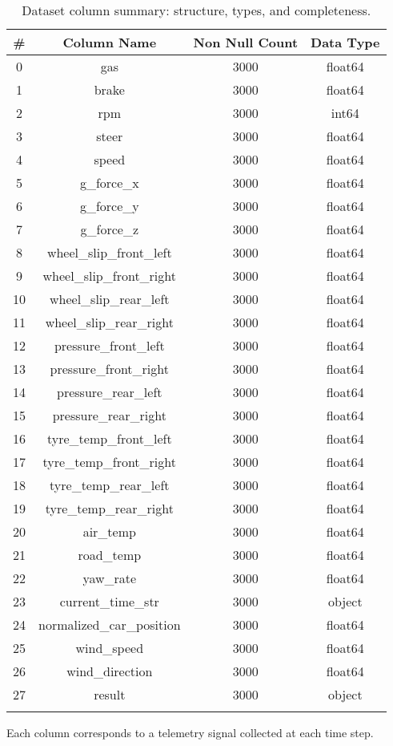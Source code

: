 \documentclass[a4paper,final,12pt]{report}
\begin{document}
\begin{longtable}{|c|c|c|c|}
\hline
\textbf{\#} & \textbf{Column Name} & \textbf{Non Null Count} & \textbf{Data Type} \\
\hline
0 & gas & 3000 & float64 \\
1 & brake & 3000 & float64 \\
2 & rpm & 3000 & int64 \\
3 & steer & 3000 & float64 \\
4 & speed & 3000 & float64 \\
5 & g\_force\_x & 3000 & float64 \\
6 & g\_force\_y & 3000 & float64 \\
7 & g\_force\_z & 3000 & float64 \\
8 & wheel\_slip\_front\_left & 3000 & float64 \\
9 & wheel\_slip\_front\_right & 3000 & float64 \\
10 & wheel\_slip\_rear\_left & 3000 & float64 \\
11 & wheel\_slip\_rear\_right & 3000 & float64 \\
12 & pressure\_front\_left & 3000 & float64 \\
13 & pressure\_front\_right & 3000 & float64 \\
14 & pressure\_rear\_left & 3000 & float64 \\
15 & pressure\_rear\_right & 3000 & float64 \\
16 & tyre\_temp\_front\_left & 3000 & float64 \\
17 & tyre\_temp\_front\_right & 3000 & float64 \\
18 & tyre\_temp\_rear\_left & 3000 & float64 \\
19 & tyre\_temp\_rear\_right & 3000 & float64 \\
20 & air\_temp & 3000 & float64 \\
21 & road\_temp & 3000 & float64 \\
22 & yaw\_rate & 3000 & float64 \\
23 & current\_time\_str & 3000 & object \\
24 & normalized\_car\_position & 3000 & float64 \\
25 & wind\_speed & 3000 & float64 \\
26 & wind\_direction & 3000 & float64 \\
27 & result & 3000 & object \\
\hline
\caption{Dataset column summary: structure, types, and completeness.}
\label{tab:dataset_structure}
\end{longtable}
Each column corresponds to a telemetry signal collected at each time step. 
\end{document}
